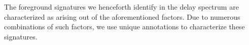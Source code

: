 \documentclass[preprint2,iop,numberedappendix]{emulateapj}
\begin{document}
\begin{itemize}
\end{itemize}

The foreground signatures we henceforth identify in the delay spectrum are characterized as arising out of the aforementioned factors. Due to numerous combinations of such factors, we use unique annotations to characterize these signatures.

\end{document}
